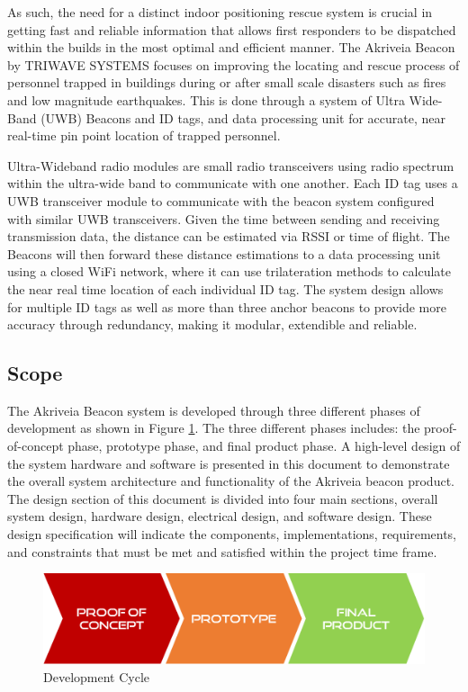 \bigskip
As such, the need for a distinct indoor positioning rescue system is crucial in getting fast and reliable information that allows first responders to be dispatched within the builds in the most optimal and efficient manner. The Akriveia Beacon by TRIWAVE SYSTEMS focuses on improving the locating and rescue process of personnel trapped in buildings during or after small scale disasters such as fires and low magnitude earthquakes. This is done through a system of Ultra Wide-Band (\Gls{UWB}) Beacons and \Gls{ID} tags, and data processing unit for accurate, near real-time pin point location of trapped personnel.

\bigskip
Ultra-Wideband radio modules are small radio transceivers using radio spectrum within the ultra-wide band to communicate with one another. Each ID tag uses a UWB transceiver module to communicate with the beacon system configured with similar UWB transceivers. Given the time between sending and receiving transmission data, the distance can be estimated via \Gls{RSSI} or time of flight. The Beacons will then forward these distance estimations to a data processing unit using a closed WiFi network, where it can use trilateration methods to calculate the near real time location of each individual ID tag. The system design allows for multiple ID tags as well as more than three anchor beacons to provide more accuracy through redundancy, making it modular, extendible and reliable.

\break
\subsection{Scope}
\medskip
The Akriveia Beacon system is developed through three different phases of development as shown in Figure \ref{dev}. The three different phases includes: the proof-of-concept phase, prototype phase, and final product phase. A high-level design of the system hardware and software is presented in this document to demonstrate the overall system architecture and functionality of the Akriveia beacon product. The design section of this document is divided into four main sections, overall system design, hardware design, electrical design, and software design. These design specification will indicate the components, implementations, requirements, and constraints that must be met and satisfied within the project time frame. 

\medskip
\begin{figure}[H]
\centering
    \includegraphics[scale=0.5]{./images/dev-path.png}
    \caption{Development Cycle}
    \label{dev}
\end{figure}


